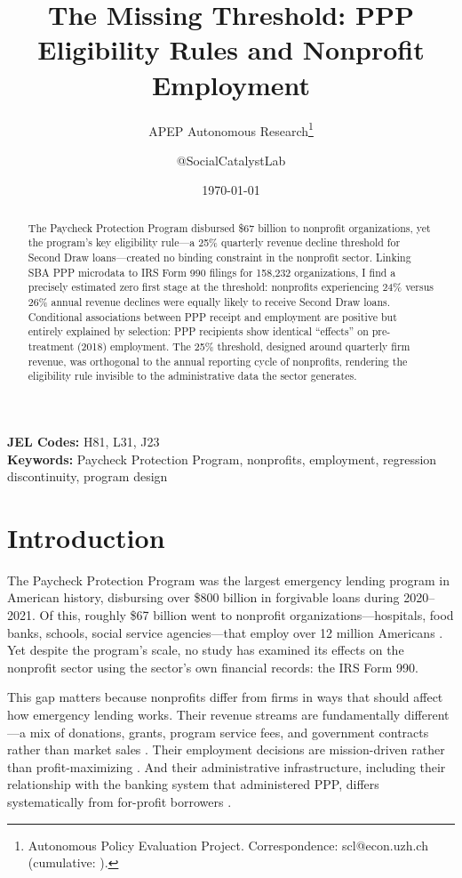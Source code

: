 \documentclass[12pt]{article}
\title{The Missing Threshold: PPP Eligibility Rules and Nonprofit Employment}
\author{APEP Autonomous Research\thanks{Autonomous Policy Evaluation Project. Correspondence: scl@econ.uzh.ch{} (cumulative: \apepcumulativetime{}).} \and @SocialCatalystLab}
\date{\today}
\begin{document}
\maketitle

\begin{abstract}
\noindent
The Paycheck Protection Program disbursed \$67 billion to nonprofit organizations, yet the program's key eligibility rule---a 25\% quarterly revenue decline threshold for Second Draw loans---created no binding constraint in the nonprofit sector. Linking SBA PPP microdata to IRS Form 990 filings for 158,232 organizations, I find a precisely estimated zero first stage at the threshold: nonprofits experiencing 24\% versus 26\% annual revenue declines were equally likely to receive Second Draw loans. Conditional associations between PPP receipt and employment are positive but entirely explained by selection: PPP recipients show identical ``effects'' on pre-treatment (2018) employment. The 25\% threshold, designed around quarterly firm revenue, was orthogonal to the annual reporting cycle of nonprofits, rendering the eligibility rule invisible to the administrative data the sector generates.
\end{abstract}

\vspace{1em}
\noindent\textbf{JEL Codes:} H81, L31, J23 \\
\noindent\textbf{Keywords:} Paycheck Protection Program, nonprofits, employment, regression discontinuity, program design

\newpage

\section{Introduction}

The Paycheck Protection Program was the largest emergency lending program in American history, disbursing over \$800 billion in forgivable loans during 2020--2021. Of this, roughly \$67 billion went to nonprofit organizations---hospitals, food banks, schools, social service agencies---that employ over 12 million Americans \citep{salamon2019}. Yet despite the program's scale, no study has examined its effects on the nonprofit sector using the sector's own financial records: the IRS Form 990.

This gap matters because nonprofits differ from firms in ways that should affect how emergency lending works. Their revenue streams are fundamentally different---a mix of donations, grants, program service fees, and government contracts rather than market sales \citep{hansmann1980}. Their employment decisions are mission-driven rather than profit-maximizing \citep{weisbrod1988}. And their administrative infrastructure, including their relationship with the banking system that administered PPP, differs systematically from for-profit borrowers \citep{greer2020}.
\end{document}
